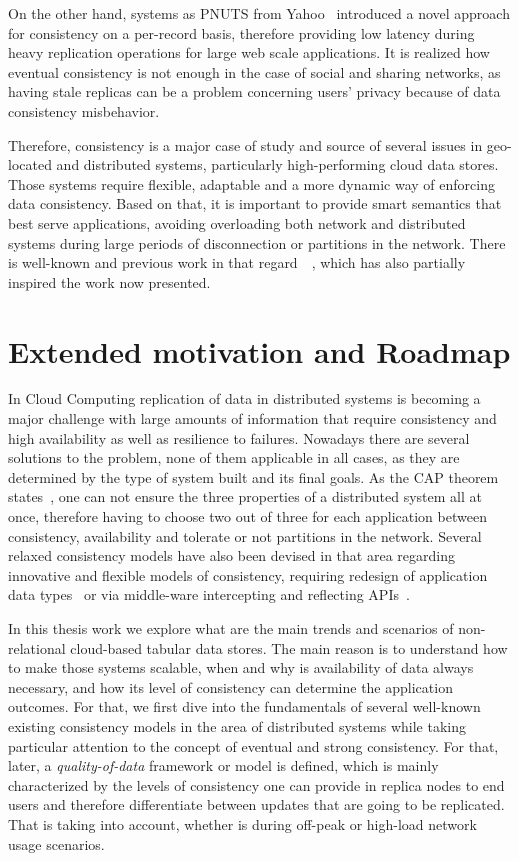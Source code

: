 On the other hand, systems as PNUTS from Yahoo~\cite{Cooper:2008} introduced a novel approach for consistency on a per-record basis, therefore providing low latency during heavy replication operations for large web scale applications. It is realized how eventual consistency is not enough in the case of social and sharing networks, as having stale replicas can be a problem concerning users' privacy because of data consistency misbehavior.

Therefore, consistency is a major case of study and source of several issues in geo-located and distributed systems, particularly high-performing cloud data stores. Those systems require flexible, adaptable and a more dynamic way of enforcing data consistency. Based on that, it is important to provide smart semantics that best serve applications, avoiding overloading both network and distributed systems during large periods of disconnection or partitions in the network. There is well-known and previous work in that regard~\cite{Kraska:2009}~\cite{chihoub:2013}, which has also partially inspired the work now presented.


\section{Extended motivation and Roadmap}
In Cloud Computing replication of data in distributed systems is becoming a major challenge with large amounts of information that require consistency and high availability as well as resilience to failures. Nowadays there are several solutions to the problem, none of them applicable in all cases, as they are determined by the type of system built and its final goals. As the CAP theorem states~\cite{Brewer:2002}, one can not ensure the three properties of a distributed system all at once, therefore having to choose two out of three for each application between consistency, availability and tolerate or not partitions in the network. Several relaxed consistency models have also been devised in that area regarding innovative and flexible models of consistency, requiring redesign of application data types~\cite{Saphiro:2011} or via middle-ware intercepting and reflecting APIs~\cite{Vfc3:2012}.

In this thesis work we explore what are the main trends and scenarios of non-relational cloud-based tabular data stores. The main reason is to understand how to make those systems scalable, when and why is availability of data always necessary, and how its level of consistency can determine the application outcomes. For that, we first dive into the fundamentals of several well-known existing consistency models in the area of distributed systems while taking particular attention to the concept of eventual and strong consistency. For that, later, a \emph{quality-of-data} framework or model is defined, which is mainly characterized by the levels of consistency one can provide in replica nodes to end users and therefore differentiate between updates that are going to be replicated. That is taking into account, whether is during off-peak or high-load network usage scenarios. 

